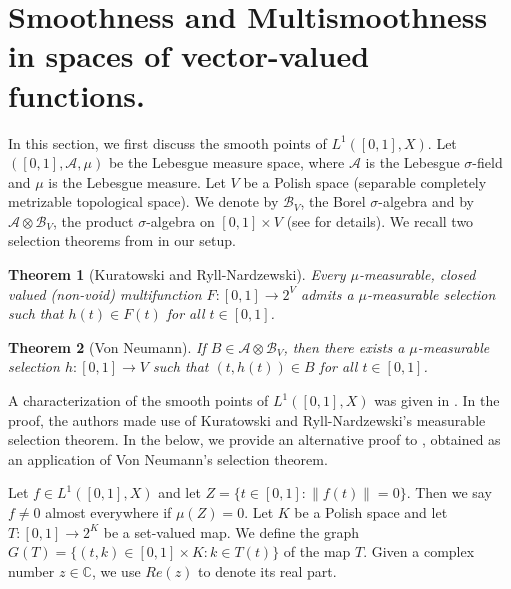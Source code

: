 \documentclass[12pt]{amsart}
\newtheorem{theorem}{Theorem}[section]
\theoremstyle{definition}
\numberwithin{equation}{section}
\begin{document}
\section{Smoothness and Multismoothness in spaces of vector-valued functions.}
In this section, we first discuss the smooth points of $L^{1}([0,1],X)$. Let $([0,1],\mathcal{A},\mu)$ be the Lebesgue measure space, where $\mathcal{A}$ is the Lebesgue $\sigma$-field and $\mu$ is the Lebesgue measure. Let $V$ be a Polish space (separable completely metrizable topological space). We denote by $\mathcal{B}_V$, the Borel $\sigma$-algebra and by $\mathcal{A}\otimes \mathcal{B}_V$, the product $\sigma$-algebra on $[0,1]\times V$ (see \cite[p. 83, 87]{S} for details). We recall two selection theorems from \cite{S} in our setup.


\begin{theorem}[Kuratowski and Ryll-Nardzewski]\cite[Theorem~5.2.1]{S}\label{KRN}
    Every $\mu$-measurable, closed valued (non-void) multifunction $F:[0,1]\longrightarrow 2^V$ admits a $\mu$-measurable selection such that $h(t)\in F(t)$ for all $t\in [0,1]$. 
\end{theorem}
\begin{theorem}[Von Neumann]\cite[Corollary~5.5.8]{S}\label{VNT}
   If $B\in \mathcal{A}\otimes \mathcal{B}_V$, then there exists a $\mu$-measurable selection $h:[0,1]\to V$ such that $(t,h(t))\in B$ for all $t\in [0,1]$.
\end{theorem}

 A characterization of the smooth points of $L^{1}([0,1],X)$ was given in \cite[Theorem~1.1]{DK}. In the proof, the authors made use of Kuratowski and Ryll-Nardzewski's measurable selection theorem. In the below, we provide an alternative proof to \cite[Theorem~1.1]{DK}, obtained as an application of Von Neumann's selection theorem.

Let $f\in L^1([0,1],X)$ and let $Z=\{t\in[0,1]:\|f(t)\|=0\}$. Then we say $f\neq0$ almost everywhere if $\mu(Z)=0$. Let $K$ be a Polish space and let $T:[0,1]\to 2^{K}$ be a set-valued map. We define the graph $G(T)=\{(t,k)\in [0,1]\times K: k\in T(t)\}$ of the map $T$. Given a complex number $z\in \mathbb{C}$, we use $Re(z)$ to denote its real part.
\end{document}
